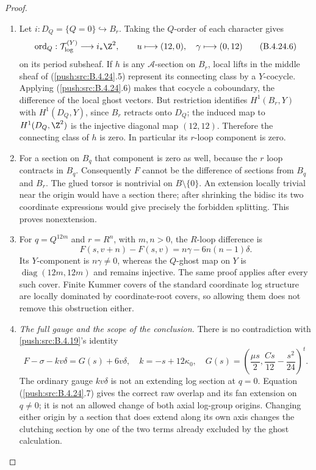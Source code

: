 \begin{proof}
\begin{enumerate}[label=\arabic*.,leftmargin=*]
\item Let $i:D_Q=\{Q=0\}\hookrightarrow B_r$.
Taking the $Q$-order of each character gives
\[
 \operatorname{ord}_Q:
 \mathcal T_{\log}^{(Y)}\longrightarrow i_*\Z^2,
 \qquad
 u\longmapsto(12,0),\quad
 \gamma\longmapsto(0,12)
 \tag{B.4.24.6}
\]
on its period subsheaf. If $h$ is any
$\mathcal A$-section on $B_r$, local lifts in
the middle sheaf of (\ref{push:src:B.4.24}.5) represent its
connecting class by a $Y$-cocycle. Applying
(\ref{push:src:B.4.24}.6) makes that cocycle a coboundary,
the difference of the local ghost vectors.
But restriction identifies $H^1(B_r,Y)$ with
$H^1(D_Q,Y)$, since $B_r$ retracts onto $D_Q$;
the induced map to $H^1(D_Q,\Z^2)$ is the
injective diagonal map $(12,12)$. Therefore
the connecting class of $h$ is zero. In
particular its $r$-loop component is zero.

\item For a section on $B_q$ that component is zero
as well, because the $r$ loop contracts in $B_q$.
Consequently $F$ cannot be the difference of
sections from $B_q$ and $B_r$. The glued torsor
is nontrivial on $B\setminus\{0\}$. An extension
locally trivial near the origin would have a
section there; after shrinking the bidisc its
two coordinate expressions would give precisely
the forbidden splitting. This proves nonextension.

\item For $q=Q^{12m}$ and $r=R^n$, with $m,n>0$,
the $R$-loop difference is
\[
 F(s,v+n)-F(s,v)
    =n\gamma-6n(n-1)\delta.
\]
Its $Y$-component is $n\gamma\ne0$,
whereas the $Q$-ghost map on $Y$ is
$\operatorname{diag}(12m,12m)$ and remains
injective. The same proof applies after every
such cover. Finite Kummer covers of the standard
coordinate log structure are locally dominated
by coordinate-root covers, so allowing them
does not remove this obstruction either.

\item \emph{The full gauge and the scope of the conclusion.}
There is no contradiction with \ref{push:src:B.4.19}'s identity
\[
 F-\sigma-kv\delta=G(s)+6v\delta,
 \quad k=-s+12\kappa_0,
 \quad G(s)=\left(\frac{\mu s}2,
                  \frac{Cs}{12}-\frac{s^2}{24}\right)^t.
 \tag{B.4.24.7}
\]
The ordinary gauge $kv\delta$ is not an extending
log section at $q=0$. Equation (\ref{push:src:B.4.24}.7) gives
the correct raw overlap and its fan extension
on $q\ne0$; it is not an allowed change of
both axial log-group origins. Changing either
origin by a section that does extend along its
own axis changes the clutching section by one
of the two terms already excluded by the
ghost calculation.


\end{enumerate}
\end{proof}
